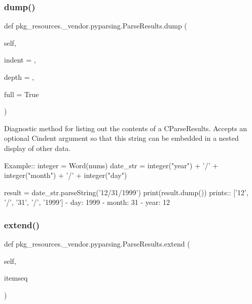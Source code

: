 \subsubsection{\texorpdfstring{dump()}{dump()}}
{\footnotesize\ttfamily def pkg\+\_\+resources.\+\_\+vendor.\+pyparsing.\+Parse\+Results.\+dump (\begin{DoxyParamCaption}\item[{}]{self,  }\item[{}]{indent = {\ttfamily \textquotesingle{}\textquotesingle{}},  }\item[{}]{depth = {},  }\item[{}]{full = {\ttfamily True} }\end{DoxyParamCaption})}

\begin{DoxyVerb}Diagnostic method for listing out the contents of a C{ParseResults}.
Accepts an optional C{indent} argument so that this string can be embedded
in a nested display of other data.

Example::
    integer = Word(nums)
    date_str = integer("year") + '/' + integer("month") + '/' + integer("day")
    
    result = date_str.parseString('12/31/1999')
    print(result.dump())
prints::
    ['12', '/', '31', '/', '1999']
    - day: 1999
    - month: 31
    - year: 12
\end{DoxyVerb}
 \mbox{\label{classpkg__resources_1_1__vendor_1_1pyparsing_1_1ParseResults_ab364b8acde3167bcd176f82ea6e1b422}} 
\subsubsection{\texorpdfstring{extend()}{extend()}}
{\footnotesize\ttfamily def pkg\+\_\+resources.\+\_\+vendor.\+pyparsing.\+Parse\+Results.\+extend (\begin{DoxyParamCaption}\item[{}]{self,  }\item[{}]{itemseq }\end{DoxyParamCaption})}

